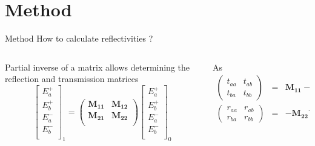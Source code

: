 \documentclass[aspectratio=169]{beamer}
\begin{document}
\section{Method}

\begin{frame}{Method}
	\alert{How to calculate reflectivities ?}
	
	\begin{columns}
		\begin{column}{0.5\textwidth}
			Partial inverse of a matrix allows determining the reflection and transmission matrices
			\begin{equation*}
			\begin{bmatrix}
			E_a^+ \\
			E_b^+ \\
			E_a^- \\
			E_b^- \\
			\end{bmatrix}_{1} = \begin{pmatrix}
			\bm{M_{11}} & \bm{M_{12}}\\
			\bm{M_{21}} & \bm{M_{22}}\\
			\end{pmatrix}\begin{bmatrix}
			E_a^+ \\
			E_b^+ \\
			E_a^- \\
			E_b^- \\
			\end{bmatrix}_{0}
			\end{equation*}
		\end{column}
		\begin{column}{0.5\textwidth}
			As 
			\begin{eqnarray*}
				\begin{pmatrix}
					t_{aa} & t_{ab} \\
					t_{ba} & t_{bb}
				\end{pmatrix} &=& \bm{M_{11}} - \bm{M_{12}}\bm{M_{22}}^{-1}\bm{M_{21}}\\
				\begin{pmatrix}
					r_{aa} & r_{ab} \\
					r_{ba} & r_{bb}
				\end{pmatrix} &=& -\bm{M_{22}}^{-1}\bm{M_{21}}
			\end{eqnarray*}
		\end{column}
	\end{columns}
\end{frame}
\end{document}
